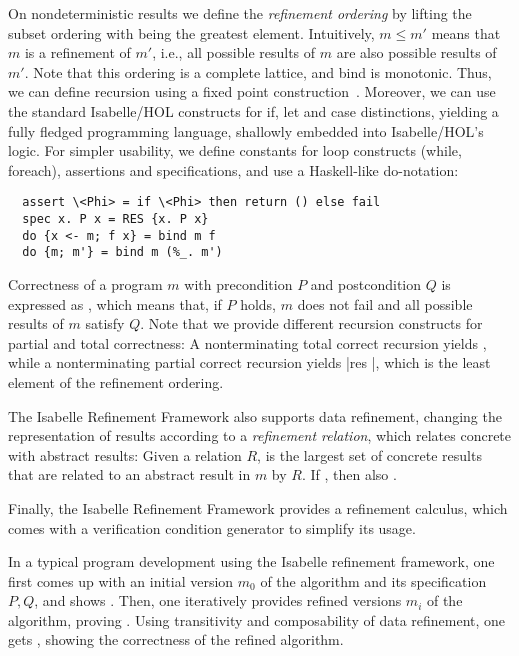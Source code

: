 \documentclass{llncs}
\begin{document}
On nondeterministic results we define the \emph{refinement ordering} by lifting the subset ordering with  being the greatest element.
Intuitively, $m\le m'$ means that $m$ is a refinement of $m'$, i.e., all possible results of $m$ are 
also possible results of $m'$. 
Note that this ordering is a complete lattice, and bind is monotonic. Thus, we can define recursion using a fixed point construction~\cite{Kr10}.
Moreover, we can use the standard Isabelle/HOL constructs for if, let and case distinctions, yielding a fully fledged programming 
language, shallowly embedded into Isabelle/HOL's logic. For simpler usability, we define constants for loop constructs (while, foreach), 
assertions and specifications, and use a Haskell-like do-notation:
\begin{lstlisting}
  assert \<Phi> = if \<Phi> then return () else fail
  spec x. P x = RES {x. P x}
  do {x <- m; f x} = bind m f
  do {m; m'} = bind m (%_. m')
\end{lstlisting}

Correctness of a program $m$ with precondition $P$ and postcondition $Q$ is expressed as , which
means that, if $P$ holds, $m$ does not fail and all possible results of $m$ satisfy $Q$. Note that we provide different recursion constructs
for partial and total correctness: A nonterminating total correct recursion yields , while a nonterminating partial correct 
recursion yields \isai|res {}|, which is the least element of the refinement ordering.

The Isabelle Refinement Framework also supports data refinement, changing the representation of results according to a \emph{refinement relation}, 
which relates concrete with abstract results: Given a relation $R$,  is the largest set of concrete results that are related to an 
abstract result in $m$ by $R$. If , then also .

Finally, the Isabelle Refinement Framework provides a refinement calculus, which comes with a verification condition 
generator to simplify its usage.

In a typical program development using the Isabelle refinement framework, one first comes up with an initial version $m_0$ of
the algorithm and its specification $P,Q$, and shows . Then, one iteratively provides refined versions $m_i$ of the algorithm,
proving . Using transitivity and composability of data refinement, one 
gets , showing the correctness of the refined algorithm.
\end{document}
